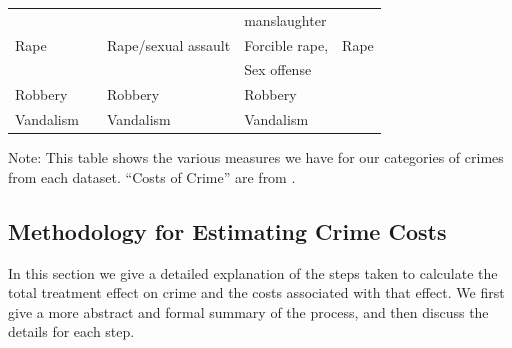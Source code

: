 \begin{table}[H]
\begin{threeparttable}
\begin{tabular}{lllll}
				&				&						& 	manslaughter	&   				\\
{Rape}			&				& Rape/sexual assault	&	Forcible rape, 	& Rape 				\\
				&				&						&	Sex offense		&					\\
{Robbery}			&				& Robbery 				&	Robbery			&					\\
{Vandalism}		&				& Vandalism				&	Vandalism		& 				\\	\bottomrule
\end{tabular}
\begin{tablenotes}
\item Note: This table shows the various measures we have for our categories of crimes from each dataset. ``Costs of Crime'' are from \cite{McCollister_etal_2010_DAD}.
\end{tablenotes}
\end{threeparttable}
\end{table}

\subsection{Methodology for Estimating Crime Costs}
\noindent In this section we give a detailed explanation of the steps taken to calculate the total treatment effect on crime and the costs associated with that effect. We first give a more abstract and formal summary of the process, and then discuss the details for each step. \\

